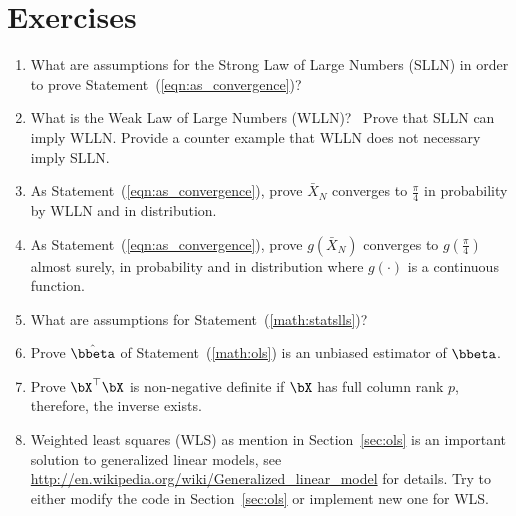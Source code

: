 \section{Exercises}
\label{sec:statistics_exercise}

\begin{enumerate}[label=\thechapter-\arabic*]
\item
What are assumptions for the Strong Law of Large Numbers (SLLN)
in order to prove Statement~(\ref{eqn:as_convergence})?

\item
What is the Weak Law of Large Numbers (WLLN)?~
Prove that SLLN can imply WLLN. Provide a counter example that
WLLN does not necessary imply SLLN.

\item
As Statement~(\ref{eqn:as_convergence}),
prove $\bar{X}_N$ converges to $\frac{\pi}{4}$ in probability by WLLN and
in distribution.

\item
As Statement~(\ref{eqn:as_convergence}),
prove $g(\bar{X}_N)$ converges to $g\left(\frac{\pi}{4}\right)$
almost surely, in probability and
in distribution where $g(\cdot)$ is a continuous function.

\item
What are assumptions for Statement~(\ref{math:statslls})?

\item
Prove $\hat{\bbeta}$ of Statement~(\ref{math:ols}) is an unbiased
estimator of $\bbeta$.

\item
Prove $\bX^\top\bX$ is non-negative definite if $\bX$ has full column rank $p$,
therefore, the inverse exists.

\item
Weighted least squares (WLS) as mention in Section~\ref{sec:ols}
is an important solution to generalized linear models, see
\url{http://en.wikipedia.org/wiki/Generalized_linear_model} for details.
Try to either modify the code in Section~\ref{sec:ols} or implement new one
for WLS.

\end{enumerate}

